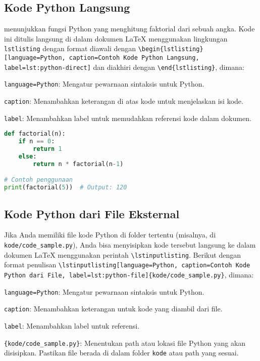 \subsection{Kode Python Langsung}

 menunjukkan fungsi Python yang menghitung faktorial dari sebuah angka. Kode ini ditulis langsung di dalam dokumen LaTeX menggunakan lingkungan \texttt{lstlisting} dengan format diawali dengan \texttt{\textbackslash begin\{lstlisting\}[language=Python, caption=Contoh Kode Python Langsung, label=lst:python-direct]} dan diakhiri dengan \texttt{\textbackslash end\{lstlisting\}}, dimana:
\begin{packed_item}
    \item \texttt{language=Python}: Mengatur pewarnaan sintaksis untuk Python.
    \item \texttt{caption}: Menambahkan keterangan di atas kode untuk menjelaskan isi kode.
    \item \texttt{label}: Menambahkan label untuk memudahkan referensi kode dalam dokumen.
\end{packed_item}

\begin{lstlisting}[language=Python, caption=Contoh Kode Python Langsung, label=lst:python-direct]
def factorial(n):
    if n == 0:
        return 1
    else:
        return n * factorial(n-1)

# Contoh penggunaan
print(factorial(5))  # Output: 120
\end{lstlisting}

\subsection{Kode Python dari File Eksternal}

Jika Anda memiliki file kode Python di folder tertentu (misalnya, di \texttt{kode/code\_sample.py}), Anda bisa menyisipkan kode tersebut langsung ke dalam dokumen LaTeX menggunakan perintah \texttt{\textbackslash lstinputlisting}. Berikut  dengan format penulisan \texttt{\textbackslash lstinputlisting[language=Python, caption=Contoh Kode Python dari File, label=lst:python-file]\{kode/code\_sample.py\}}, dimana:
\begin{packed_item}
    \item \texttt{language=Python}: Mengatur pewarnaan sintaksis untuk Python.
    \item \texttt{caption}: Menambahkan keterangan untuk kode yang diambil dari file.
    \item \texttt{label}: Menambahkan label untuk referensi.
    \item \texttt{\{kode/code\_sample.py\}}: Menentukan path atau lokasi file Python yang akan disisipkan. Pastikan file berada di dalam folder \texttt{kode} atau path yang sesuai.
\end{packed_item}

